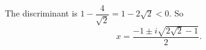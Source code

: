 The discriminant is $1-\dfrac4{\sqrt2}=1-2\sqrt2<0$. So
\[x=\boxed{\dfrac{-1\pm i\sqrt{2\sqrt2-1}}2}.\]
